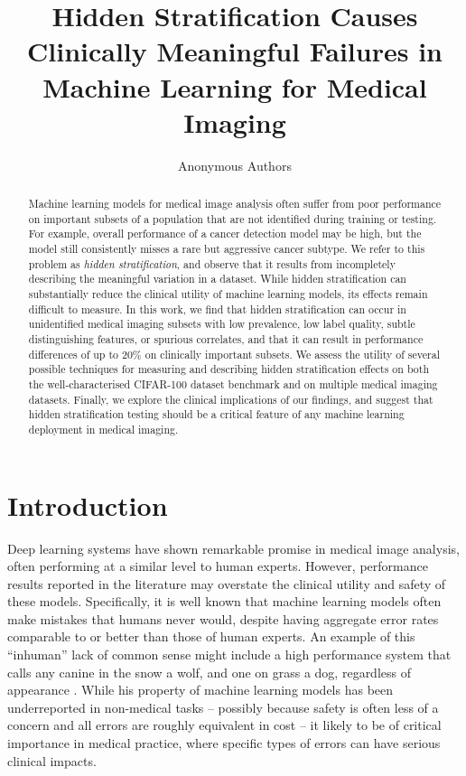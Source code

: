 \documentclass{article}
\title{Hidden Stratification Causes Clinically Meaningful Failures in Machine Learning for Medical Imaging
}
\author{%
Anonymous Authors
}
\begin{document}
\maketitle

\begin{abstract}
Machine learning models for medical image analysis often suffer from poor performance on important subsets of a population that are not identified during training or testing.
For example, overall performance of a cancer detection model may be high, but the model still consistently misses a rare but aggressive cancer subtype.    
We refer to this problem as \textit{hidden stratification}, and observe that it results from incompletely describing the meaningful variation in a dataset.
While hidden stratification can substantially reduce the clinical utility of machine learning models, its effects remain difficult to measure.
In this work, we find that hidden stratification can occur in unidentified medical imaging subsets with low prevalence, low label quality, subtle distinguishing features, or spurious correlates, and that it can result in performance differences of up to 20\% on clinically important subsets.
We assess the utility of several possible techniques for measuring and describing hidden stratification effects on both the well-characterised CIFAR-100 dataset benchmark and on multiple medical imaging datasets.
Finally, we explore the clinical implications of our findings, and suggest that hidden stratification testing should be a critical feature of any machine learning deployment in medical imaging.

\end{abstract}

\section{Introduction}

Deep learning systems have shown remarkable promise in medical image analysis, often performing at a similar level to human experts. 
 However, performance results reported in the literature may overstate the clinical utility and safety of these models.  
 Specifically, it is well known that machine learning models often make mistakes that humans never would, despite having aggregate error rates comparable to or better than those of human experts. An example of this ``inhuman'' lack of common sense might include a high performance system that calls any canine in the snow a wolf, and one on grass a dog, regardless of appearance \citep{ribeiro2016should}.
While his property of machine learning models has been underreported in non-medical tasks -- possibly because safety is often less of a concern and all errors are roughly equivalent in cost -- it likely to be of critical importance in medical practice, where specific types of errors can have serious clinical impacts. 
 
\end{document}
